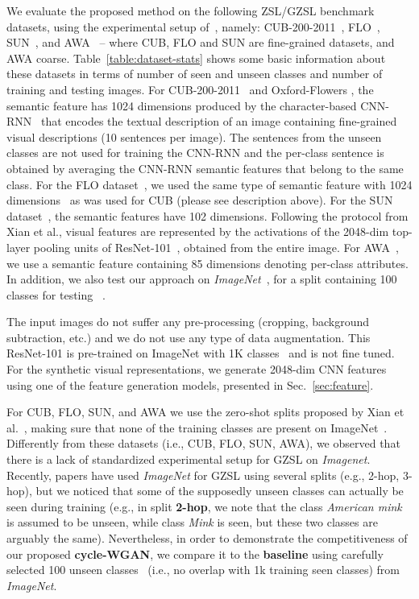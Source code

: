 \documentclass[runningheads]{llncs}
\begin{document}
We evaluate the proposed method on the following ZSL/GZSL benchmark datasets, using the experimental setup of~\cite{XianCVPR2017}, namely: 
CUB-200-2011~\cite{welinder2010caltech,XianCVPR2018},
FLO~\cite{nilsback2008automated},
SUN~\cite{XianCVPR2017}, and
AWA~\cite{lampert2009lerning,XianCVPR2017}  -- where CUB, FLO and SUN are fine-grained datasets, and AWA coarse. Table~\ref{table:dataset-stats} shows some basic information about these datasets in terms of number of seen and unseen classes and number of training and testing images.   
For CUB-200-2011~\cite{welinder2010caltech,XianCVPR2018} and Oxford-Flowers \cite{nilsback2008automated}, the semantic feature has 1024 dimensions produced by the character-based CNN-RNN~\cite{reed2016learning} that encodes the textual description of an image containing fine-grained visual descriptions (10 sentences per image).  
The sentences from the unseen classes are not used for training the CNN-RNN and the per-class sentence is obtained by averaging the CNN-RNN semantic features that belong to
the same class.
For the FLO dataset~\cite{nilsback2008automated}, we used the same type of semantic feature with 1024 dimensions~\cite{reed2016learning} as was used for CUB (please see description above).
For the SUN dataset~\cite{XianCVPR2017}, the semantic features have 102 dimensions.  Following the protocol from Xian et al.\cite{XianCVPR2017}, visual features are represented by the activations of the 2048-dim top-layer pooling units of ResNet-101~\cite{he2016resnet}, obtained from the entire image. 
For AWA~\cite{lampert2009lerning,XianCVPR2017}, we use a semantic feature containing 85 dimensions denoting per-class attributes.
In addition, we also test our approach on \textit{ImageNet}~\cite{deng2009imagenet}, for a split containing 100 classes for testing ~\cite{wang2017multi}.


The input images do not suffer any pre-processing (cropping, background subtraction, etc.) and we do not use any type of
data augmentation.
This ResNet-101 is pre-trained on ImageNet with 1K classes~\cite{deng2009imagenet} and is not fine tuned.
For the synthetic visual representations, we generate 2048-dim CNN features using one of the feature generation models, presented in Sec.~\ref{sec:feature}.

For CUB, FLO, SUN, and AWA we use the zero-shot splits proposed by Xian et al.~\cite{XianCVPR2017}, making sure that none of the training classes are present on ImageNet~\cite{deng2009imagenet}.
Differently from these datasets (i.e., CUB, FLO, SUN, AWA), we observed that there is a lack of standardized experimental setup for GZSL on \textit{Imagenet}. Recently, papers have used \textit{ImageNet} for GZSL using several splits (e.g., 2-hop, 3-hop), but we noticed that some of the supposedly unseen classes can actually be seen during training (e.g., in split \textbf{2-hop}, we note that the class \textit{American mink} is assumed to be unseen, while class \textit{Mink} is seen, but these two classes are arguably the same).  Nevertheless, in order to demonstrate the competitiveness of our proposed \textbf{cycle-WGAN}, we compare it to the \textbf{baseline} using carefully selected 100 unseen classes~\cite{wang2017multi} (i.e., no overlap with 1k training seen classes) from \textit{ImageNet}.  
\end{document}
